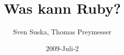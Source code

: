 \usepackage[german]{babel}
\usepackage[T1]{fontenc}
\usepackage[utf8x]{inputenc}

\usepackage{verbatim} 
\usepackage{listings} 





\title[Ruby]{Was kann Ruby?}
\author{Sven Suska, Thomas Preymesser}
\date{2009-Juli-2}

\newcommand{\bls}[1]{{\bf\lstinline{#1}}}
